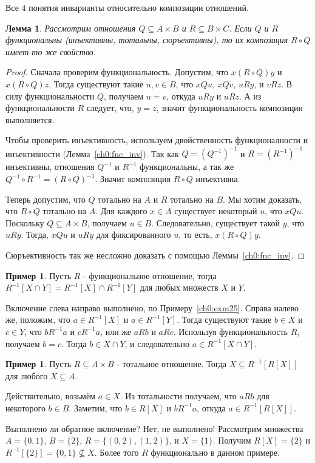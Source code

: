 \documentclass[12pt,notitlepage]{article}
\theoremstyle{plain}
\newtheorem{lemma}[thm]{Лемма}
\theoremstyle{definition}
\newtheorem{exm}[thm]{Пример}
\theoremstyle{plain}
\newcommand{\sbs}{\subseteq}
\newcommand{\1}{\mathbf{1}}
\newcommand{\0}{\mathbf{0}}
\begin{document}
\noindent Все 4 понятия инварианты относительно композиции отношений.
\begin{lemma}\label{ch0:fnc_cmp} Рассмотрим отношения $Q \sbs A \times B$ и $R \sbs B \times C$. Если $Q$ и $R$ функциональны (инъективны, тотальны, сюръективны), то их композиция $R \circ Q$ имеет то же свойство.
\end{lemma}	
\begin{proof}
	Сначала проверим функциональность. Допустим, что $x(R \circ Q)y$ и $x(R \circ Q)z$. Тогда существуют такие $u,v\in B$, что $xQu$, $xQv$, $u R y$, и $v R z$. В силу функциональности $Q$, получаем $u = v$, откуда $u R y$ и $u R z$. А из функциональности $R$ следует, что, $y = z$, значит функциональность композиции выполняется.
	
	Чтобы проверить инъективность, используем двойственность функционалности и инъективности (Лемма~\ref{ch0:fnc_inv}). Так как $Q = (Q^{-1})^{-1}$ и $R = (R^{-1})^{-1}$ инъективны, отношения $Q^{-1}$ и $R^{-1}$ функциональны, а так же $Q^{-1} \circ R^{-1} = (R \circ Q)^{-1}$. Значит композиция $R \circ Q$ инъективна.
	
	Теперь допустим, что $Q$ тотально на $A$ и $R$ тотально на $B$. Мы хотим доказать, что $R \circ Q$ тотально на $A$. Для каждого $x \in A$ существует некоторый $u$, что $x Q u$. Поскольку $Q \sbs A \times B$, получаем $u \in B$. Следовательно, существует такой $y$, что $u R y$. Тогда, $x Q u$ и $u R y$ для фиксированного $u$, то есть, $x(R \circ Q)y$.
	
	Сюръективность так же несложно доказать с помощью Леммы~\ref{ch0:fnc_inv}.
\end{proof}

\begin{exm}
	Пусть $R$ - функциональное отношение, тогда $R^{-1}[X \cap Y] = R^{-1}[X] \cap R^{-1}[Y]$ для любых множеств $X$ и $Y$.
	
	Включение слева направо выполнено, по Примеру~\ref{ch0:exm25}. Справа налево же, положим, что $a \in R^{-1}[X]$ и $a \in R^{-1}[Y]$. Тогда существуют такие $b \in X$ и $c \in Y$, что $bR^{-1}a$ и $cR^{-1}a$, или же $a R b$ и $a R c$. Используя функциональность $R$, получаем $b = c$. Тогда $b \in X \cap Y$, и следовательно $a \in R^{-1}[X \cap Y]$.
\end{exm}

\begin{exm}
	Пусть $R \sbs A \times B$ - тотальное отношение. Тогда $X \sbs R^{-1}[R[X]]$ для любого $X \sbs A$.
	
	Действительно, возьмём $a \in X$. Из тотальности получаем, что $a R b$ для некоторого $b \in B$. Заметим, что $b \in R[X]$ и $b R^{-1} a$, откуда $a \in R^{-1}[R[X]]$.
	
	Выполнено ли обратное включение? Нет, не выполнено! Рассмотрим множества $A = \{0,1\}$, $B = \{2\}$, $R = \{(0,2), (1,2)\}$, и $X = \{1\}$. Получим $R[X] = \{2\}$ и $R^{-1}[\{2\}] = \{0,1\} \not\sbs X$. Более того $R$ функционально в данном примере.
\end{exm}
\end{document}
